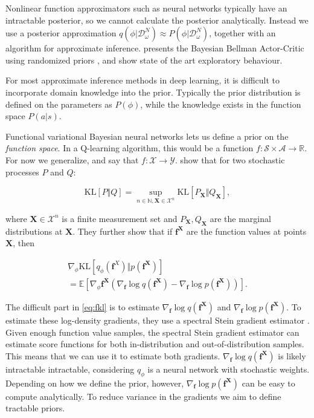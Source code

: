 \documentclass[]{uai2021} %
\newcommand{\R}{\mathbb{R}}
\newcommand{\E}{\mathbb{E}}
\newcommand{\N}{\mathbb{N}}
\newcommand{\D}{\mathcal{D}}
\newcommand{\X}{\mathbf{X}}
\newcommand{\f}{\mathbf{f}}
\newcommand{\state}{\mathcal{S}}
\newcommand{\action}{\mathcal{A}}
\newcommand{\KL}{\mathrm{KL}}
\begin{document}
Nonlinear function approximators such as neural networks typically have an intractable
posterior, so we cannot calculate the posterior analytically. Instead we use a posterior approximation
\(q(\phi \vert \D_\omega^N) \approx P(\phi \vert \D_\omega^N)\), together with an algorithm
for approximate inference. \citet{fellows_bayesian_2021} presents the Bayesian Bellman Actor-Critic
using randomized priors \citep{osband_randomized_2018}, and show state of the art exploratory
behaviour.

For most approximate inference methods in deep learning, it is difficult to incorporate domain
knowledge into the prior. Typically the prior distribution is defined on the parameters as \(P(\phi)\),
while the knowledge exists in the function space \(P(a \vert s)\).

Functional variational Bayesian neural networks \citep{sun_functional_2019} lets us define a prior on the
\emph{function space}. In a Q-learning algorithm, this would be a function
\(f : \state \times \action \rightarrow \R\). For now we generalize, and say that
\(f : \mathcal{X} \rightarrow \mathcal{Y}\).
\citet{sun_functional_2019} show that for two stochastic processes \(P\) and \(Q\):

\begin{equation}
    \KL[P \Vert Q] = \sup_{n \in \N, \X \in \mathcal{X}^n} \KL \left[ P_\X \Vert Q_\X \right],
\end{equation}

where \(\X \in \mathcal{X}^n\) is a finite measurement set and \(P_\X, Q_\X\) are the marginal distributions
at \(\X\). They further show that if \(\f^\X\) are the function values at points \(\X\), then

\begin{multline}\label{eq:fkl}
    \nabla_\phi \KL[q_\phi(\f^X) \Vert p(\f^\X)] \\
    = \E \left[ \nabla_\phi \f^\X( \nabla_\f \log q(\f^\X) - \nabla_\f \log p(\f^\X)) \right].
\end{multline}

The difficult part in \eqref{eq:fkl} is to estimate \(\nabla_\f \log q(\f^\X)\) and \(\nabla_\f \log p(\f^\X)\).
To estimate these log-density gradients, they use a spectral Stein gradient estimator \citep{shi_spectral_2018}.
Given enough function value samples, the spectral Stein gradient estimator can estimate score functions
for both in-distribution and out-of-distribution samples. This means that we can use it to estimate
both gradients. \(\nabla_\f \log q(\f^\X)\) is likely intractable intractable, considering \(q_\phi\) is
a neural network with stochastic weights. Depending on how we define the prior, however, \(\nabla_\f \log p(\f^\X)\)
can be easy to compute analytically. To reduce variance in the gradients we aim to define tractable priors.
\end{document}
